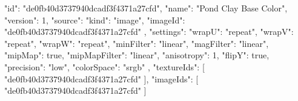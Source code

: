 {
  "id": "de0fb40d3737940dcadf3f4371a27cfd",
  "name": "Pond Clay Base Color",
  "version": 1,
  "source": {
    "kind": "image",
    "imageId": "de0fb40d3737940dcadf3f4371a27cfd"
  },
  "settings": {
    "wrapU": "repeat",
    "wrapV": "repeat",
    "wrapW": "repeat",
    "minFilter": "linear",
    "magFilter": "linear",
    "mipMap": true,
    "mipMapFilter": "linear",
    "anisotropy": 1,
    "flipY": true,
    "precision": "low",
    "colorSpace": "srgb"
  },
  "textureIds": [
    "de0fb40d3737940dcadf3f4371a27cfd"
  ],
  "imageIds": [
    "de0fb40d3737940dcadf3f4371a27cfd"
  ]
}
